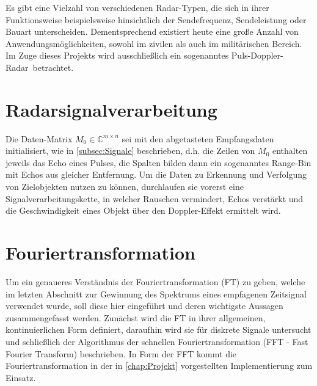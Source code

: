 \documentclass[a4paper,12pt,oneside,german,toc=bibliography]{scrbook}
\theoremstyle{definition}
\theoremstyle{plain}
\numberwithin{equation}{section}
\newcommand{\C}{\mathds{C}}
\begin{document}
Es gibt eine Vielzahl von verschiedenen Radar-Typen, die sich in ihrer Funktionsweise beispielsweise hinsichtlich der Sendefrequenz, Sendeleistung  oder Bauart unterscheiden. Dementsprechend existiert heute eine große Anzahl von Anwendungsmöglichkeiten, sowohl im zivilen als auch im militärischen Bereich. Im Zuge dieses Projekts wird ausschließlich ein sogenanntes \glqq Puls-Doppler-Radar\grqq ~betrachtet. 









\section{Radarsignalverarbeitung}
Die Daten-Matrix $M_0 \in \C^{m \times n}$ sei mit den abgetasteten Empfangsdaten initialisiert, wie in \cref{subsec:Signale} beschrieben, d.h. die Zeilen von $M_0$ enthalten jeweils das Echo eines Pulses, die Spalten bilden dann ein sogenanntes Range-Bin mit Echos aus gleicher Entfernung. Um die Daten zu Erkennung und Verfolgung von Zielobjekten nutzen zu können, durchlaufen sie vorerst eine Signalverarbeitungskette, in welcher Rauschen vermindert, Echos verstärkt und die Geschwindigkeit eines Objekt über den Doppler-Effekt ermittelt wird.







\section{Fouriertransformation}
Um ein genaueres Verständnis der Fouriertransformation (FT) zu geben, welche im letzten Abschnitt zur Gewinnung des Spektrums eines empfagenen Zeitsignal verwendet wurde, soll diese hier eingeführt und deren wichtigste Aussagen zusammengefasst werden. Zunächst wird die FT in ihrer allgemeinen, kontinuierlichen Form definiert, daraufhin wird sie für diskrete Signale untersucht und schließlich der Algorithmus der schnellen Fouriertransformation (FFT - Fast Fourier Transform) beschrieben. In Form der FFT kommt die Fouriertransformation in der in \cref{chap:Projekt} vorgestellten Implementierung zum Einsatz.
\end{document}
